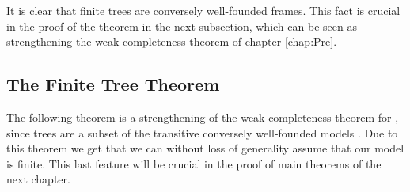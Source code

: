 \documentclass[../main.tex]{subfiles}
\begin{document}
It is clear that finite trees are conversely well-founded frames. This fact is crucial
in the proof of the theorem in the next subsection, which can be seen as strengthening the
weak completeness theorem of chapter \ref{chap:Pre}.

\subsection{The Finite Tree Theorem}

The following theorem is a strengthening of the weak completeness theorem for
\GL, since trees are a subset of the transitive conversely well-founded models
. Due to this theorem we get that we can without loss of generality assume that
our model is finite. This last feature will be crucial in the proof of main
theorems of the next chapter.
\end{document}
